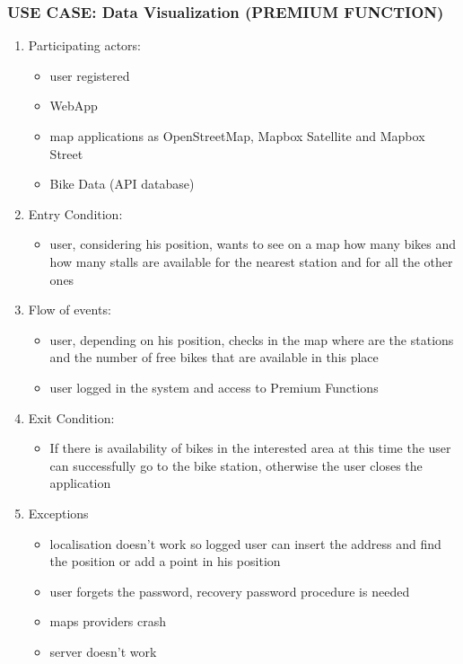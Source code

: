 \documentclass{article}
\begin{document}
\subsubsection{\textbf{USE CASE}: Data Visualization (PREMIUM FUNCTION)}
\begin{enumerate}
\item Participating actors: 
\begin{itemize}
    \item user registered
    \item WebApp
    \item map applications as OpenStreetMap, Mapbox  Satellite and Mapbox Street 
        \item Bike Data (API database)
\end{itemize}
\item Entry Condition: 
\begin{itemize}
    \item user, considering his position, wants to see on a map how many bikes and how many stalls are available for the nearest station and for all the other ones
\end{itemize}
\item Flow of events: 
\begin{itemize}
    \item user, depending on his position, checks in the map where are the stations and the number of free bikes that are available in this place
    \item user logged in the system and access to Premium Functions 
\end{itemize}
\item Exit Condition: 
\begin{itemize}
    \item If there is availability of bikes in the interested area at this time the user can successfully go to the bike station, otherwise the user closes the application
\end{itemize}
\item Exceptions
\begin{itemize}
    \item localisation doesn’t work so logged user can insert the address and find the position or add a point in his position
    \item user forgets the password, recovery password procedure is needed
    \item maps providers crash
    \item server doesn’t work
\end{itemize}
\end{enumerate}
\end{document}
